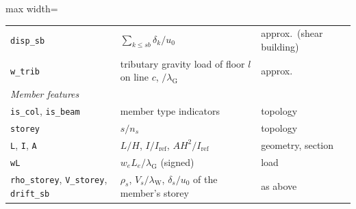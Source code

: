 \begin{table}[h]
\begin{adjustbox}{max width=\textwidth}
\begin{tabular}{lll}
\texttt{disp\_sb} & $\sum_{k\le sb}\delta_k/u_0$ & approx.\ (shear building) \\
\texttt{w\_trib} & tributary gravity load of floor $l$ on line $c$, $/\lambda_\mathrm{G}$ & approx.\ \\
\midrule
\multicolumn{3}{l}{\emph{Member features}} \\
\texttt{is\_col}, \texttt{is\_beam} & member type indicators & topology \\
\texttt{storey} & $s/n_s$ & topology \\
\texttt{L}, \texttt{I}, \texttt{A} & $L/H$, $I/I_\mathrm{ref}$, $AH^2/I_\mathrm{ref}$ & geometry, section \\
\texttt{wL} & $w_eL_e/\lambda_\mathrm{G}$ (signed) & load \\
\texttt{rho\_storey}, \texttt{V\_storey}, \texttt{drift\_sb} & $\rho_s$, $V_s/\lambda_\mathrm{W}$, $\delta_s/u_0$ of the member's storey & as above \\
\bottomrule
\end{tabular}
\end{adjustbox}
\end{table}

